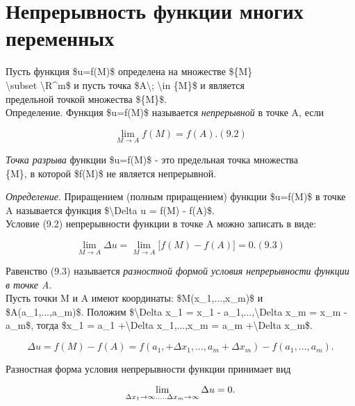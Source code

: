 \documentclass[
]{article}
\author{}
\date{}
\begin{document}
\hypertarget{ux43dux435ux43fux440ux435ux440ux44bux432ux43dux43eux441ux442ux44c-ux444ux443ux43dux43aux446ux438ux438-ux43cux43dux43eux433ux438ux445-ux43fux435ux440ux435ux43cux435ux43dux43dux44bux445}{%
\section{Непрерывность функции многих
переменных}\label{ux43dux435ux43fux440ux435ux440ux44bux432ux43dux43eux441ux442ux44c-ux444ux443ux43dux43aux446ux438ux438-ux43cux43dux43eux433ux438ux445-ux43fux435ux440ux435ux43cux435ux43dux43dux44bux445}}

Пусть функция \$u=f(M)\$ определена на множестве \$\{M\} \\
\textbackslash subset \textbackslash R\^{}m\$ и пусть точка
\$A\textbackslash; \textbackslash in \{M\}\$ и является \\
предельной точкой множества \$\{M\}\$.\\
Определение. Функция \$u=f(M)\$ называется \emph{непрерывной} в точке A,
если

\[\lim_{M \to A} f(M) = f(A). (9.2)\]

\emph{Точка разрыва} функции \$u=f(M)\$ - это предельная точка
множества\\
\{M\}, в которой \$f(M)\$ не является непрерывной.

\emph{Определение}. Приращением (полным приращением) функции \$u=f(M)\$
в точке A называется функция \$\textbackslash Delta u = f(M) - f(A)\$.
\\
Условие (9.2) непрерывности функции в точке A можно записать в виде:

\[\lim_{M\to A} \Delta u = \lim_{M \to A}\Bigg[ f(M) - f(A) \Bigg] = 0. (9.3)\]

Равенство (9.3) называется \emph{разностной формой условия непрерывности
функции в точке A.}\\
Пусть точки M и A имеют координаты: \$M(x\_1,...,x\_m)\$ и \\
\$A(a\_1,...,a\_m)\$. Положим \$\textbackslash Delta x\_1 = x\_1 -
a\_1,...,\textbackslash Delta x\_m = x\_m - a\_m\$, тогда \$x\_1 = a\_1
+\textbackslash Delta x\_1,...,x\_m = a\_m +\textbackslash Delta x\_m\$.

\[\Delta u = f(M)-f(A) = f(a_1,+\Delta x_1,...,a_m+\Delta x_m) - f(a_1,...,a_m).\]

Разностная форма условия непрерывности функции принимает вид

\[\lim_{\Delta x_1 \to \infty \\ ..... \\ \Delta x_m \to \infty} \Delta u=0.\]
\end{document}
